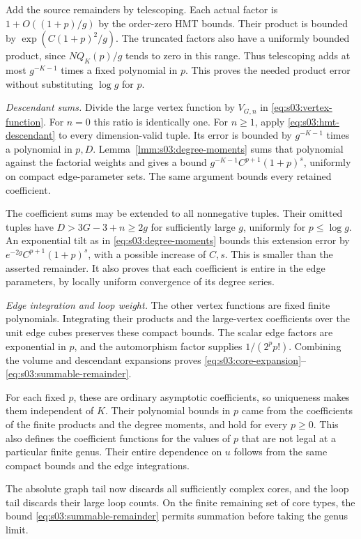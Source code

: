 \begin{prf}
Add the source remainders by telescoping. Each actual factor is
$1+O((1+p)/g)$ by the order-zero HMT bounds. Their product is
bounded by $\exp(C(1+p)^2/g)$. The truncated factors also have
a uniformly bounded product, since
$NQ_K(p)/g$ tends to zero in this range.
Thus telescoping adds at most $g^{-K-1}$ times a fixed polynomial
in $p$. This proves the needed product error without substituting
$\log g$ for $p$.

\smallskip\noindent
\emph{Descendant sums.}
Divide the large vertex function by $V_{G,n}$ in
\eqref{eq:s03:vertex-function}. For $n=0$ this ratio is identically
one. For $n\geq1$, apply
\eqref{eq:s03:hmt-descendant} to every dimension-valid tuple.
Its error is bounded by $g^{-K-1}$ times a polynomial in $p,D$.
Lemma~\ref{lmm:s03:degree-moments} sums that polynomial against
the factorial weights and gives a bound
$g^{-K-1}C^{p+1}(1+p)^s$, uniformly on compact edge-parameter sets.
The same argument bounds every retained coefficient.

The coefficient sums may be extended to all nonnegative tuples.
Their omitted tuples have $D>3G-3+n\geq2g$ for sufficiently
large $g$, uniformly for $p\leq\log g$.
An exponential tilt as in \eqref{eq:s03:degree-moments} bounds
this extension error by $e^{-2g}C^{p+1}(1+p)^s$, with a possible
increase of $C,s$. This is smaller than the asserted remainder.
It also proves that each coefficient is entire in the edge
parameters, by locally uniform convergence of its degree series.

\smallskip\noindent
\emph{Edge integration and loop weight.}
The other vertex functions are fixed finite polynomials. Integrating
their products and the large-vertex coefficients over the unit
edge cubes preserves these compact bounds. The scalar edge factors
are exponential in $p$, and the automorphism factor supplies
$1/(2^pp!)$. Combining the volume and descendant expansions proves
\eqref{eq:s03:core-expansion}--\eqref{eq:s03:summable-remainder}.

For each fixed $p$, these are ordinary asymptotic coefficients, so
uniqueness makes them independent of $K$. Their polynomial bounds
in $p$ came from the coefficients of the finite products and the
degree moments, and hold for every $p\geq0$. This also defines
the coefficient functions for the values of $p$ that are not legal
at a particular finite genus. Their entire dependence on $u$
follows from the same compact bounds and the edge integrations.
\end{prf}

The absolute graph tail now discards all sufficiently complex cores,
and the loop tail discards their large loop counts. On the finite
remaining set of core types, the bound
\eqref{eq:s03:summable-remainder} permits summation before taking
the genus limit.

